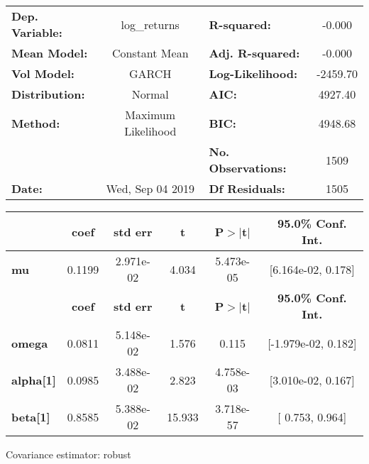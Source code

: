 \begin{center}
\begin{tabular}{lclc}
\toprule
\textbf{Dep. Variable:} &    log\_returns    & \textbf{  R-squared:         } &    -0.000   \\
\textbf{Mean Model:}    &   Constant Mean    & \textbf{  Adj. R-squared:    } &    -0.000   \\
\textbf{Vol Model:}     &       GARCH        & \textbf{  Log-Likelihood:    } &   -2459.70  \\
\textbf{Distribution:}  &       Normal       & \textbf{  AIC:               } &    4927.40  \\
\textbf{Method:}        & Maximum Likelihood & \textbf{  BIC:               } &    4948.68  \\
\textbf{}               &                    & \textbf{  No. Observations:  } &    1509     \\
\textbf{Date:}          &  Wed, Sep 04 2019  & \textbf{  Df Residuals:      } &    1505     \\
\bottomrule
\end{tabular}
\begin{tabular}{lccccc}
            & \textbf{coef} & \textbf{std err} & \textbf{t} & \textbf{P$> |$t$|$} & \textbf{95.0\% Conf. Int.}  \\
\midrule
\textbf{mu} &       0.1199  &    2.971e-02     &     4.034  &      5.473e-05       &    [6.164e-02,  0.178]      \\
                  & \textbf{coef} & \textbf{std err} & \textbf{t} & \textbf{P$> |$t$|$} & \textbf{95.0\% Conf. Int.}  \\
\midrule
\textbf{omega}    &       0.0811  &    5.148e-02     &     1.576  &          0.115       &    [-1.979e-02,  0.182]     \\
\textbf{alpha[1]} &       0.0985  &    3.488e-02     &     2.823  &      4.758e-03       &    [3.010e-02,  0.167]      \\
\textbf{beta[1]}  &       0.8585  &    5.388e-02     &    15.933  &      3.718e-57       &     [  0.753,  0.964]       \\
\bottomrule
\end{tabular}
\end{center}

Covariance estimator: robust
